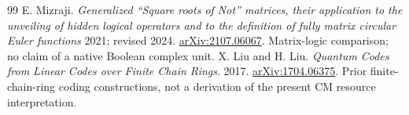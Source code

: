 \documentclass[11pt,a4paper]{article}
\theoremstyle{definition}\newtheorem{definition}[theorem]{Definition}
\begin{document}
\begin{thebibliography}{99}
 E. Mizraji. \emph{Generalized ``Square roots of Not'' matrices, their application to the unveiling of hidden logical operators and to the definition of fully matrix circular Euler functions} 2021; revised 2024. \href{https://arxiv.org/abs/2107.06067}{arXiv:2107.06067}. Matrix-logic comparison; no claim of a native Boolean complex unit.
 X. Liu and H. Liu. \emph{Quantum Codes from Linear Codes over Finite Chain Rings}. 2017. \href{https://arxiv.org/abs/1704.06375}{arXiv:1704.06375}. Prior finite-chain-ring coding constructions, not a derivation of the present CM resource interpretation.
\end{thebibliography}
\end{document}
